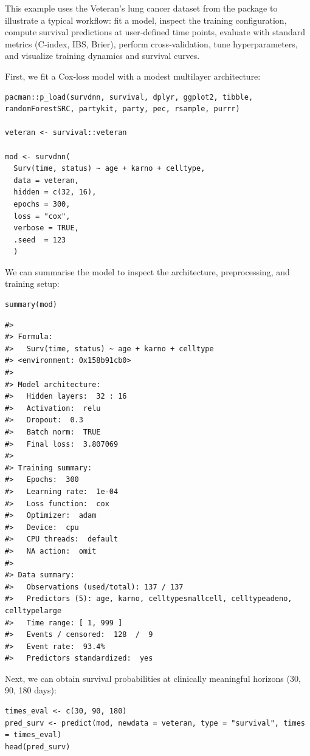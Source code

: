This example uses the Veteran's lung cancer dataset from the  package \citep{survival-book} to illustrate a typical  workflow: fit a model, inspect the training configuration, compute survival predictions at user‑defined time points, evaluate with standard metrics (C‑index, IBS, Brier), perform cross‑validation, tune hyperparameters, and visualize training dynamics and survival curves.

First, we fit a Cox‑loss model with a modest multilayer architecture:

\begin{verbatim}
pacman::p_load(survdnn, survival, dplyr, ggplot2, tibble, randomForestSRC, partykit, party, pec, rsample, purrr)

veteran <- survival::veteran

mod <- survdnn(
  Surv(time, status) ~ age + karno + celltype,
  data = veteran,
  hidden = c(32, 16),
  epochs = 300,
  loss = "cox",
  verbose = TRUE,
  .seed  = 123
  )
\end{verbatim}

We can summarise the model to inspect the architecture, preprocessing, and training setup:

\begin{verbatim}
summary(mod)
\end{verbatim}

\begin{verbatim}
#> 
#> Formula:
#>   Surv(time, status) ~ age + karno + celltype
#> <environment: 0x158b91cb0>
#> 
#> Model architecture:
#>   Hidden layers:  32 : 16 
#>   Activation:  relu 
#>   Dropout:  0.3 
#>   Batch norm:  TRUE 
#>   Final loss:  3.807069 
#> 
#> Training summary:
#>   Epochs:  300 
#>   Learning rate:  1e-04 
#>   Loss function:  cox 
#>   Optimizer:  adam 
#>   Device:  cpu 
#>   CPU threads:  default 
#>   NA action:  omit 
#> 
#> Data summary:
#>   Observations (used/total): 137 / 137
#>   Predictors (5): age, karno, celltypesmallcell, celltypeadeno, celltypelarge
#>   Time range: [ 1, 999 ]
#>   Events / censored:  128  /  9 
#>   Event rate:  93.4% 
#>   Predictors standardized:  yes
\end{verbatim}

Next, we can obtain survival probabilities at clinically meaningful horizons (30, 90, 180 days):

\begin{verbatim}
times_eval <- c(30, 90, 180)
pred_surv <- predict(mod, newdata = veteran, type = "survival", times = times_eval)
head(pred_surv)
\end{verbatim}

